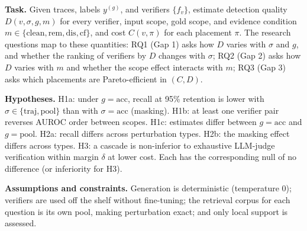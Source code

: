 \documentclass[conference]{IEEEtran}
\begin{document}
\textbf{Task.} Given traces, labels $y^{(g)}$, and verifiers $\{f_v\}$, estimate detection quality $D(v,\sigma,g,m)$ for every verifier, input scope, gold scope, and evidence condition $m\in\{\mathrm{clean},\mathrm{rem},\mathrm{dis},\mathrm{cf}\}$, and cost $C(v,\pi)$ for each placement $\pi$. The research questions map to these quantities: RQ1 (Gap 1) asks how $D$ varies with $\sigma$ and $g$, and whether the ranking of verifiers by $D$ changes with $\sigma$; RQ2 (Gap 2) asks how $D$ varies with $m$ and whether the scope effect interacts with $m$; RQ3 (Gap 3) asks which placements are Pareto-efficient in $(C, D)$.

\textbf{Hypotheses.} H1a: under $g=\mathrm{acc}$, recall at 95\% retention is lower with $\sigma\in\{\mathrm{traj},\mathrm{pool}\}$ than with $\sigma=\mathrm{acc}$ (masking). H1b: at least one verifier pair reverses AUROC order between scopes. H1c: estimates differ between $g=\mathrm{acc}$ and $g=\mathrm{pool}$. H2a: recall differs across perturbation types. H2b: the masking effect differs across types. H3: a cascade is non-inferior to exhaustive LLM-judge verification within margin $\delta$ at lower cost. Each has the corresponding null of no difference (or inferiority for H3).

\textbf{Assumptions and constraints.} Generation is deterministic (temperature 0); verifiers are used off the shelf without fine-tuning; the retrieval corpus for each question is its own pool, making perturbation exact; and only local support is assessed.

\end{document}
